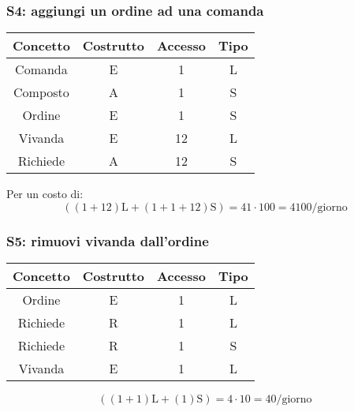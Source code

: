 \documentclass[a4paper,12pt]{report}
\begin{document}
\subsubsection{S4: aggiungi un ordine ad una comanda}
%
\begin{table}[H]
    \centering
    \begin{tabular}{|| c | c | c | c ||}
        \hline
        Concetto & Costrutto & Accesso & Tipo\\
        \hline
        Comanda & E & 1 & L\\
        \hline
        Composto & A & 1 & S\\
        \hline
        Ordine & E & 1 & S\\
        \hline
        Vivanda & E & 12 & L\\
        \hline
        Richiede & A & 12 & S\\
        \hline
    \end{tabular}
\end{table}
%
Per un costo di:
%
\begin{equation}
    ((1+12)\text{L} + (1+1+12)\text{S}) = 41 \cdot 100 = 4100\text{/giorno}
\end{equation}
%
\subsubsection{S5: rimuovi vivanda dall'ordine}
\begin{table}[H]
    \centering
    \begin{tabular}{|| c | c | c | c ||}
        \hline
        Concetto & Costrutto & Accesso & Tipo\\
        \hline
        Ordine & E & 1 & L\\
        \hline
        Richiede & R & 1 & L\\
        \hline
        Richiede & R & 1 & S\\
        \hline
        Vivanda & E & 1 & L\\
        \hline
    \end{tabular}
\end{table}
%
\begin{equation}
    ((1+1)\text{L} + (1)\text{S}) = 4 \cdot 10 = 40\text{/giorno}
\end{equation}
%
\end{document}

